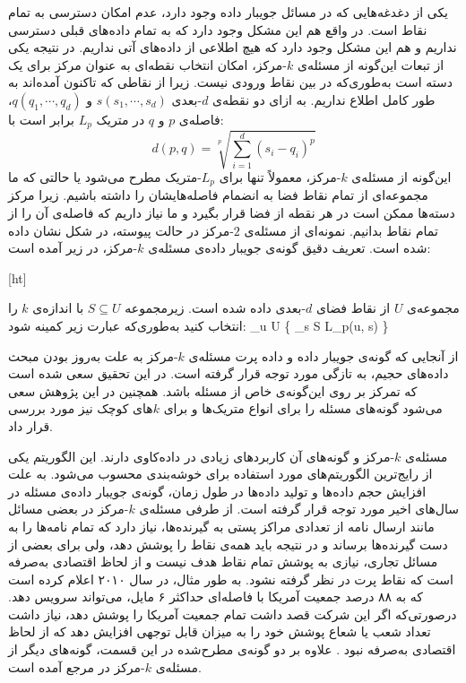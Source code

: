 یکی از دغدغه‌هایی که در مسائل جویبار داده وجود دارد، عدم امکان دسترسی به تمام نقاط است.
در واقع هم این مشکل وجود دارد که به تمام داده‌های قبلی دسترسی نداریم و هم این مشکل وجود دارد که هیچ اطلاعی از داده‌های آتی نداریم.
در نتیجه یکی از تبعات این‌گونه از مسئله‌ی $k$-مرکز، امکان انتخاب نقطه‌ای به عنوان مرکز برای یک دسته است به‌طوری‌که در بین نقاط ورودی نیست.
زیرا از نقاطی که تاکنون آمده‌اند به طور کامل اطلاع نداریم.
به ازای دو نقطه‌ی $d$-بعدی $s(s_1, \cdots, s_d)$ و $q(q_1, \cdots, q_d)$، فاصله‌ی $p$ و $q$ در متریک $L_p$ برابر است با:
$$d(p, q) = \sqrt[p]{\sum_{i=1}^{d} (s_i - q_i) ^ p}$$
این‌گونه از مسئله‌ی $k$-مرکز، معمولاً تنها برای $L_p$-متریک مطرح می‌شود یا حالتی که ما مجموعه‌ای از تمام نقاط فضا به انضمام فاصله‌هایشان را داشته باشیم.
زیرا مرکز دسته‌ها ممکن است در هر نقطه از فضا قرار بگیرد و ما نیاز داریم که فاصله‌ی آن را از تمام نقاط بدانیم.
نمونه‌ای از مسئله‌ی $2$-مرکز در حالت پیوسته، در شکل  نشان داده شده است.
تعریف دقیق گونه‌ی جویبار داده‌ی مسئله‌ی $k$‌-مرکز، در زیر آمده است:

[ht]

 مجموعه‌ی $U$ از نقاط فضای $d$-بعدی داده شده است.
زیرمجموعه $S \subseteq U$ با اندازه‌ی $k$ را انتخاب کنید به‌طوری‌که عبارت زیر کمینه شود:
\max_{u \in U} \{ \min_{s \in S} L_p(u, s) \}

از آنجایی که گونه‌ی جویبار داده و داده پرت مسئله‌ی $k$-مرکز به علت به‌روز بودن مبحث داده‌های حجیم، به تازگی مورد توجه قرار گرفته است.
در این تحقیق سعی شده است که تمرکز بر روی این‌گونه‌ی خاص از مسئله باشد.
همچنین در این پژوهش سعی می‌شود گونه‌های مسئله را برای انواع متریک‌ها و برای $k$های کوچک نیز مورد بررسی قرار داد. 


مسئله‌ی $k$-مرکز و گونه‌های آن کاربردهای زیادی در داده‌کاوی دارند.
این الگوریتم یکی از رایج‌ترین الگوریتم‌های مورد استفاده برای خوشه‌بندی محسوب می‌شود.
به علت افزایش حجم داده‌ها و تولید داده‌ها در طول زمان، گونه‌ی جویبار داده‌ی مسئله در سال‌های اخیر مورد توجه قرار گرفته است.
از طرفی مسئله‌ی $k$-مرکز در بعضی مسائل مانند ارسال نامه از تعدادی مراکز پستی به گیرنده‌ها، نیاز دارد که تمام نامه‌ها را به دست گیرنده‌ها برساند و در نتیجه باید همه‌ی نقاط را پوشش دهد، ولی برای بعضی از مسائل تجاری، نیازی به پوشش تمام نقاط هدف نیست و از لحاظ اقتصادی به‌صرفه است که نقاط پرت در نظر گرفته نشود.
به طور مثال،  در سال ۲۰۱۰ اعلام کرده است که به ۸۸ درصد جمعیت آمریکا با فاصله‌ای حداکثر ۶ مایل، می‌تواند سرویس دهد.
درصورتی‌که اگر این شرکت قصد داشت تمام جمعیت آمریکا را پوشش دهد، نیاز داشت تعداد شعب یا شعاع پوشش خود را به میزان قابل توجهی افزایش دهد که از لحاظ اقتصادی به‌صرفه نبود .
علاوه بر دو گونه‌ی مطرح‌شده در این قسمت، گونه‌های دیگر از مسئله‌ی $k$-مرکز در مرجع  آمده است.

